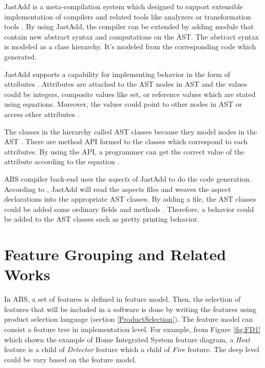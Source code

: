 JastAdd is a meta-compilation system which designed to support extensible implementation of compilers and related tools like analyzers or transformation tools \citep{web.JastAdd.JastAddOverview}. By using JastAdd, the compiler can be extended by adding module that contain new abstract syntax and computations on the AST. The abstract syntax is modeled as a class hierarchy. It's modeled from the corresponding code which generated. 

JastAdd supports a capability for implementing behavior in the form of attributes \citep{web.JastAdd.JastAddOverview}. Attributes are attached to the AST nodes in AST and the values could be integers, composite values like set, or reference values which are stated using equations. Moreover, the values could point to other nodes in AST or access other attributes \citep{thesis.niken.deltaRelationalMappingUsingABS}.

The classes in the hierarchy called AST classes because they model nodes in the AST \citep{web.JastAdd.JastAddOverview}. There are method API formed to the classes which correspond to each attributes. By using the API, a programmer can get the correct value of the attribute according to the equation \citep{thesis.niken.deltaRelationalMappingUsingABS}.

ABS compiler back-end uses the \textit{aspects} of JastAdd to do the code generation. According to \citep{web.JastAdd.JastAddReferenceManual}, JastAdd will read the aspects files and weaves the aspect declarations into the appropriate AST classes. By adding a  file, the AST classes could be added some ordinary fields and methods \citep{web.JastAdd.JastAddReferenceManual}. Therefore, a behavior could be added to the AST classes such as pretty printing behavior.


\section{Feature Grouping and Related Works}
In ABS, a set of features is defined in feature model. Then, the selection of features that will be included in a software is done by writing the features using product selection language (section \ref{ProductSelection}). The feature model can consist a feature tree in implementation level. For example, from Figure \ref{fig:FD1} which shown the example of Home Integrated System feature diagram, a \textit{Heat} feature is a child of \textit{Detector} feature which a child of \textit{Fire} feature. The deep level could be vary based on the feature model.

